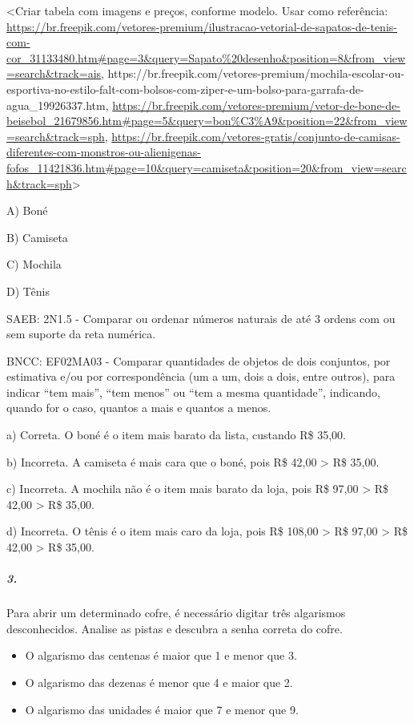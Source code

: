 \textless{}Criar tabela com imagens e preços, conforme modelo. Usar como
referência:
\url{https://br.freepik.com/vetores-premium/ilustracao-vetorial-de-sapatos-de-tenis-com-cor_31133480.htm\#page=3\&query=Sapato\%20desenho\&position=8\&from_view=search\&track=ais},
https://br.freepik.com/vetores-premium/mochila-escolar-ou-esportiva-no-estilo-falt-com-bolsos-com-ziper-e-um-bolso-para-garrafa-de-agua\_19926337.htm,
\url{https://br.freepik.com/vetores-premium/vetor-de-bone-de-beisebol_21679856.htm\#page=5\&query=bon\%C3\%A9\&position=22\&from_view=search\&track=sph},
\url{https://br.freepik.com/vetores-gratis/conjunto-de-camisas-diferentes-com-monstros-ou-alienigenas-fofos_11421836.htm\#page=10\&query=camiseta\&position=20\&from_view=search\&track=sph}\textgreater{}

A) Boné

B) Camiseta

C) Mochila

D) Tênis

SAEB: 2N1.5 - Comparar ou ordenar números naturais de até 3 ordens com
ou sem suporte da reta numérica.

BNCC: EF02MA03 - Comparar quantidades de objetos de dois conjuntos, por
estimativa e/ou por correspondência (um a um, dois a dois, entre
outros), para indicar ``tem mais'', ``tem menos'' ou ``tem a mesma
quantidade'', indicando, quando for o caso, quantos a mais e quantos a
menos.

a) Correta. O boné é o item mais barato da lista, custando R\$ 35,00.

b) Incorreta. A camiseta é mais cara que o boné, pois R\$ 42,00
\textgreater{} R\$ 35,00.

c) Incorreta. A mochila não é o item mais barato da loja, pois R\$ 97,00
\textgreater{} R\$ 42,00 \textgreater{} R\$ 35,00.

d) Incorreta. O tênis é o item mais caro da loja, pois R\$ 108,00
\textgreater{} R\$ 97,00 \textgreater{} R\$ 42,00 \textgreater{} R\$
35,00.

\subparagraph{3. }\label{section-117}

Para abrir um determinado cofre, é necessário digitar três algarismos
desconhecidos. Analise as pistas e descubra a senha correta do cofre.

\begin{itemize}
\item
  O algarismo das centenas é maior que 1 e menor que 3.
\item
  O algarismo das dezenas é menor que 4 e maior que 2.
\item
  O algarismo das unidades é maior que 7 e menor que 9.
\end{itemize}

